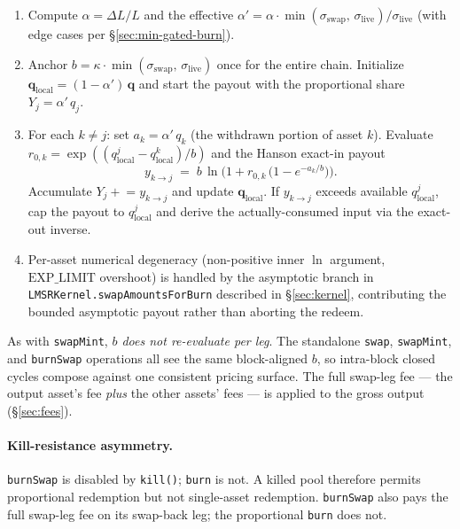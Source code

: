 \documentclass[11pt]{article}
\begin{document}
\begin{enumerate}
  \item Compute $\alpha = \Delta L / L$ and the effective
        $\alpha' = \alpha \cdot \min(\sigma_{\mathrm{swap}},\,
        \sigma_{\mathrm{live}}) / \sigma_{\mathrm{live}}$
        (with edge cases per \S\ref{sec:min-gated-burn}).
  \item Anchor $b = \kappa \cdot \min(\sigma_{\mathrm{swap}},\,
        \sigma_{\mathrm{live}})$ once for the entire chain.
        Initialize $\mathbf{q}_{\mathrm{local}} = (1 -
        \alpha')\,\mathbf{q}$ and start the payout with the
        proportional share $Y_j = \alpha'\,q_j$.
  \item For each $k \ne j$: set $a_k = \alpha'\,q_k$ (the withdrawn
        portion of asset $k$). Evaluate
        $r_{0,k} = \exp((q_{\mathrm{local}}^j -
        q_{\mathrm{local}}^k)/b)$ and the Hanson exact-in payout
        \[
          y_{k \to j} \;=\; b\,\ln\!\Big(1 + r_{0,k}\,\big(1 -
          e^{-a_k/b}\big)\Big).
        \]
        Accumulate $Y_j \mathrel{+}{=} y_{k \to j}$ and update
        $\mathbf{q}_{\mathrm{local}}$. If $y_{k \to j}$ exceeds
        available $q_{\mathrm{local}}^j$, cap the payout to
        $q_{\mathrm{local}}^j$ and derive the actually-consumed
        input via the exact-out inverse.
  \item Per-asset numerical degeneracy (non-positive inner $\ln$
        argument, $\mathrm{EXP\_LIMIT}$ overshoot) is handled by the
        asymptotic branch in
        \texttt{LMSRKernel.swapAmountsForBurn} described in
        \S\ref{sec:kernel}, contributing the bounded asymptotic
        payout rather than aborting the redeem.
\end{enumerate}

As with \texttt{swapMint}, \emph{$b$ does not re-evaluate per leg}.
The standalone \texttt{swap}, \texttt{swapMint}, and \texttt{burnSwap}
operations all see the same block-aligned $b$, so intra-block closed
cycles compose against one consistent pricing surface. The full
swap-leg fee --- the output asset's fee \emph{plus} the other assets'
fees --- is applied to the gross output (\S\ref{sec:fees}).

\paragraph{Kill-resistance asymmetry.}
\texttt{burnSwap} is disabled by \texttt{kill()}; \texttt{burn} is
not. A killed pool therefore permits proportional redemption but not
single-asset redemption. \texttt{burnSwap} also pays the full swap-leg
fee on its swap-back leg; the proportional \texttt{burn} does not.
\end{document}
